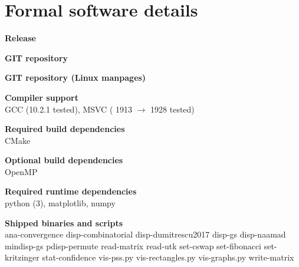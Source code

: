 \section*{Formal software details}
  \textbf{Release}\\
  \dptkversion
  
  \textbf{GIT repository}\\
  
  \textbf{GIT repository (Linux manpages)}\\
  
  \textbf{Compiler support}\\
  GCC (10.2.1 tested), MSVC ( 1913 $\rightarrow$ 1928 tested)

  \textbf{Required build dependencies}\\
  CMake
    
  \textbf{Optional build dependencies}\\
  OpenMP
  
  \textbf{Required runtime dependencies}\\
  python (3), matplotlib, numpy
  
  \textbf{Shipped binaries and scripts}\\
  ana-convergence
  disp-combinatorial
disp-dumitrescu2017
disp-gs
disp-naamad
mindisp-gs
pdisp-permute
read-matrix
read-utk
set-cswap
set-fibonacci
set-kritzinger
stat-confidence
vis-pss.py
vis-rectangles.py
vis-graphs.py
write-matrix
\clearpage
